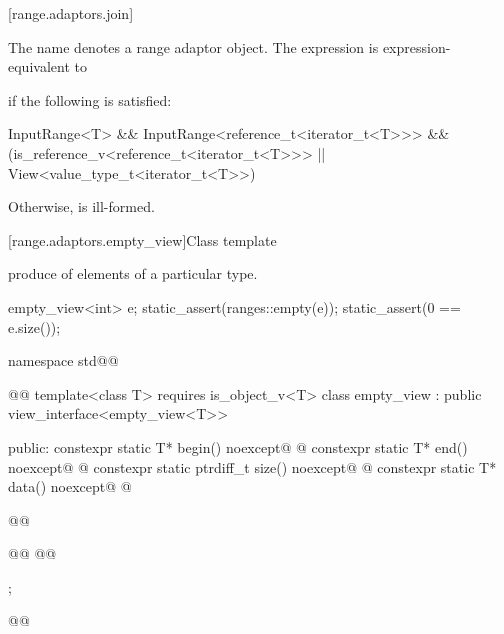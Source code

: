 \begin{itemdescr}
\pnum
\oldtxt{\returns} 
\end{itemdescr}

[range.adaptors.join]{}

\pnum
The name  denotes a range adaptor
object.  The expression
  is
expression-equivalent to 
{\color{oldclr}
if the following is satisfied:
\begin{codeblock}
InputRange<T> &&
InputRange<reference_t<iterator_t<T>>> &&
(is_reference_v<reference_t<iterator_t<T>>> ||
 View<value_type_t<iterator_t<T>>)
\end{codeblock}
Otherwise,  is ill-formed.
} %

[range.adaptors.empty_view]{Class template }

\pnum
{}   produce
  of  elements of
a particular type.

\pnum
\begin{example}
\begin{codeblock}
empty_view<int> e;
static_assert(ranges::empty(e));
static_assert(0 == e.size());
\end{codeblock}
\end{example}

\begin{codeblock}
namespace std@@ { @@
  template<class T>
    requires is_object_v<T>
  class empty_view : public view_interface<empty_view<T>> {
  public:
    constexpr static T* begin() noexcept@\oldtxt{;} @
    constexpr static T* end() noexcept@\oldtxt{;} @
    constexpr static ptrdiff_t size() noexcept@\oldtxt{;} @
    constexpr static T* data() noexcept@\oldtxt{;} @

    @@

    @@
    @@
  };
}@\oldtxt{\}}@
\end{codeblock}

